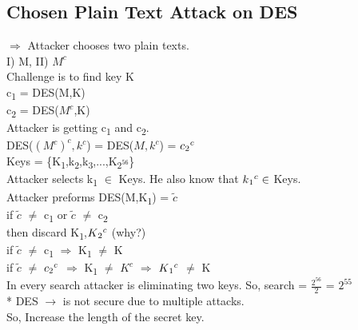 \documentclass[11pt]{article}
\begin{document}
	\subsection{Chosen Plain Text Attack on DES}
	$\Rightarrow$ Attacker chooses two plain texts.\\
	I) M, II) $M^c$\\
	Challenge is to find key K\\
	c\textsubscript{1} = DES(M,K)\\
	c\textsubscript{2} = DES($M^c$,K)\\
	Attacker is getting c\textsubscript{1} and c\textsubscript{2}.\\
	DES($(M^c)^c,k^c$) = DES($M,k^c$) = $c\textsubscript{2}^c$\\
	Keys = \{K\textsubscript{1},k\textsubscript{2},k\textsubscript{3},...,K\textsubscript{$2^{56}$}\}\\
	Attacker selects k\textsubscript{1} $\in$ Keys. He also know that $k\textsubscript{1}^c \in$ Keys.\\
	Attacker preforms DES(M,K\textsubscript{1}) = ${\widetilde{c}}$\\
	if ${\widetilde{c}}$ $\neq$ c\textsubscript{1} or ${\widetilde{c}}$ $\neq$ c\textsubscript{2}\\
	then discard K\textsubscript{1},$K\textsubscript{2}^c$ (why?)\\
	if ${\widetilde{c}}$ $\neq$ c\textsubscript{1} $\Rightarrow$ K\textsubscript{1} $\neq$ K \\ 
	if ${\widetilde{c}}$ $\neq$ $c\textsubscript{2}^c$ $\Rightarrow$ K\textsubscript{1} $\neq$ $K^c$ $\Rightarrow$ $K\textsubscript{1}^c$ $\neq$ K \\ 
	In every search attacker is eliminating two keys. So, search = $\frac{2^{56}}{2}$ = $2^{55}$\\
	\mbox{*} DES $\rightarrow$ is not secure due to multiple attacks.\\
	So, Increase the length of the secret key.\\
\end{document}
